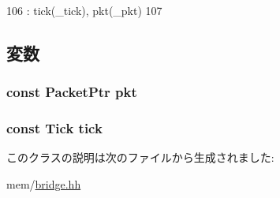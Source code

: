 \begin{DoxyCode}
106                                                    : tick(_tick), pkt(_pkt)
107         { }
\end{DoxyCode}


\subsection{変数}
\hypertarget{classBridge_1_1DeferredPacket_a6fb971eb547deb70a1eb9fc09047e9ae}{
\subsubsection[{pkt}]{\setlength{\rightskip}{0pt plus 5cm}const {\bf PacketPtr} {\bf pkt}}}
\label{classBridge_1_1DeferredPacket_a6fb971eb547deb70a1eb9fc09047e9ae}
\hypertarget{classBridge_1_1DeferredPacket_a018b1d349ea79fddf1472935835a1d96}{
\subsubsection[{tick}]{\setlength{\rightskip}{0pt plus 5cm}const {\bf Tick} {\bf tick}}}
\label{classBridge_1_1DeferredPacket_a018b1d349ea79fddf1472935835a1d96}


このクラスの説明は次のファイルから生成されました:\begin{DoxyCompactItemize}
\item 
mem/\hyperlink{bridge_8hh}{bridge.hh}\end{DoxyCompactItemize}
